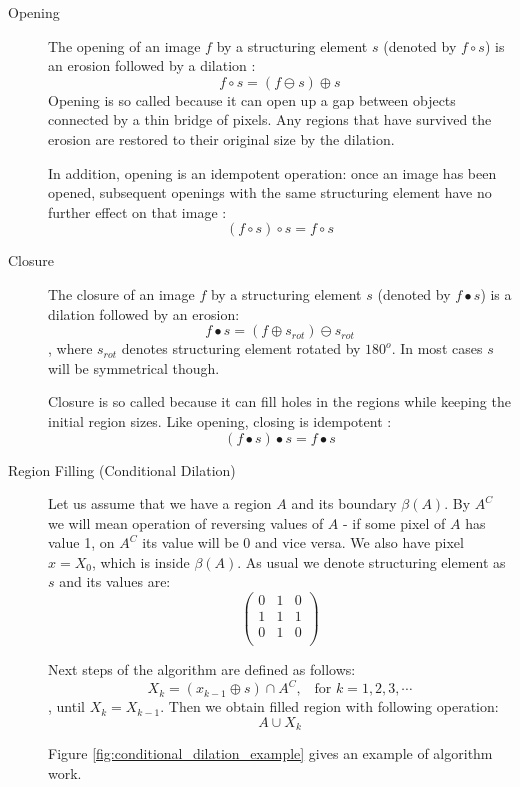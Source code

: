 \documentclass{article}
\begin{document}
\begin{description}
%
% 
\item[Opening]
The opening of an image $f$  by a structuring element $s$ (denoted by $f \circ s$) is an erosion followed by a dilation \cite{morphological}: 
\[
f \circ s = (f \ominus s) \oplus s
\]
Opening is so called because it can open up a gap between objects connected by a thin bridge of pixels. Any regions that have survived the erosion are restored to their original size by the dilation.

In addition, opening is an idempotent operation: once an image has been opened, subsequent openings with the same structuring element have no further effect on that image \cite{morphological}:
\[
(f \circ s) \circ s = f \circ s
\]


%
%
\item[Closure] The closure of an image $f$  by a structuring element $s$ (denoted by $f \bullet s$) is a dilation followed by an erosion: 
\[
f \bullet s = (f \oplus s_{rot}) \ominus s_{rot}
\]
, where $s_{rot}$ denotes structuring element rotated by $180^{o}$. In most cases $s$ will be symmetrical though.

Closure is so called because it can fill holes in the regions while keeping the initial region sizes. Like opening, closing is idempotent \cite{morphological}:
\[
(f \bullet s) \bullet s = f \bullet s
\]

\pagebreak
%
%

\item[Region Filling (Conditional Dilation)]
Let us assume that we have a region $A$ and its boundary $\beta (A)$. By $A^{C}$ we will mean operation of reversing values of $A$ - if some pixel of $A$ has value 1, on $A^{C}$ its value will be 0 and vice versa. We also have pixel $x = X_{0}$, which is inside $\beta (A)$. As usual we denote structuring element as $s$ and its values are:
\[
\begin{pmatrix}
  0 & 1 & 0 \\
  1 & 1 & 1 \\
  0 & 1 & 0 \\
 \end{pmatrix}
 \]


Next steps of the algorithm are defined as follows:
\[
X_{k} = (x_{k-1} \oplus s) \cap A^{C}, \; \; \; \text{for  } k = 1,2,3,\cdots
\]
, until $X_k = X_{k-1}$. Then we obtain filled region with following operation:
\[
A \cup X_k
\]

Figure \ref{fig:conditional_dilation_example} gives an example of algorithm work.


\end{description}
\end{document}
